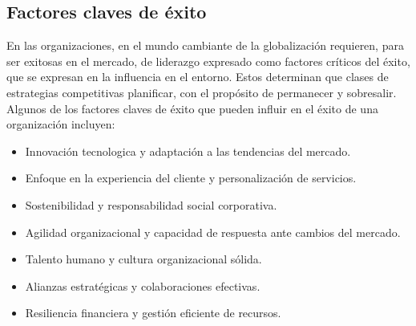 \subsection{Factores claves de éxito}
En las organizaciones, en el mundo cambiante de la globalización requieren, para ser exitosas en el mercado, de liderazgo expresado como factores críticos del éxito, que se expresan en la influencia en el entorno. Estos determinan que clases de estrategias competitivas planificar, con el propósito de permanecer y sobresalir.\cite{factores-exito}
Algunos de los factores claves de éxito que pueden influir en el éxito de una organización incluyen:

\begin{itemize}
    \item Innovación tecnologica y adaptación a las tendencias del mercado.
    \item Enfoque en la experiencia del cliente y personalización de servicios.
    \item Sostenibilidad y responsabilidad social corporativa.
    \item Agilidad organizacional y capacidad de respuesta ante cambios del mercado.
    \item Talento humano y cultura organizacional sólida.
    \item Alianzas estratégicas y colaboraciones efectivas.
    \item Resiliencia financiera y gestión eficiente de recursos.

\end{itemize}

